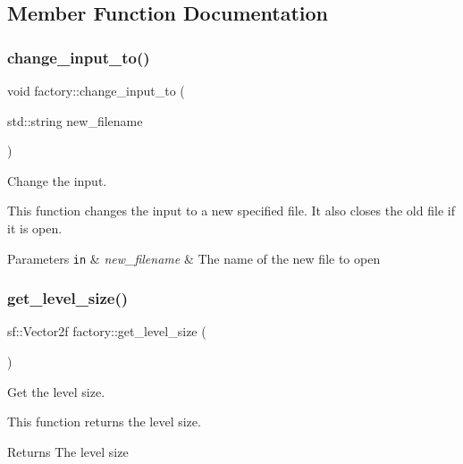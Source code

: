 \subsection{Member Function Documentation}
\mbox{\label{classfactory_a9e164a8fbb65188de99c39d55d7cc384}} 
\subsubsection{\texorpdfstring{change\+\_\+input\+\_\+to()}{change\_input\_to()}}
{\footnotesize\ttfamily void factory\+::change\+\_\+input\+\_\+to (\begin{DoxyParamCaption}\item[{std\+::string}]{new\+\_\+filename }\end{DoxyParamCaption})}



Change the input. 

This function changes the input to a new specified file. It also closes the old file if it is open. 
\begin{DoxyParams}[1]{Parameters}
\mbox{\tt in}  & {\em new\+\_\+filename} & The name of the new file to open \\
\hline
\end{DoxyParams}
\mbox{\label{classfactory_af9bb026273b34fc032ca5ac73d457611}} 
\subsubsection{\texorpdfstring{get\+\_\+level\+\_\+size()}{get\_level\_size()}}
{\footnotesize\ttfamily sf\+::\+Vector2f factory\+::get\+\_\+level\+\_\+size (\begin{DoxyParamCaption}{ }\end{DoxyParamCaption})}



Get the level size. 

This function returns the level size.

\begin{DoxyReturn}{Returns}
The level size 
\end{DoxyReturn}
\mbox{\label{classfactory_a3c3a039b8f76a947267dbe659166550b}} 
